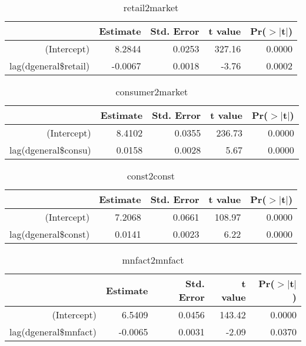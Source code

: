 \documentclass[12pt,a4paper]{report}
\begin{document}
	\begin{table}[ht]
		\centering
		\begin{tabular}{rrrrr}
			\hline
			& Estimate & Std. Error & t value & Pr($>$$|$t$|$) \\ 
			\hline
			(Intercept) & 8.2844 & 0.0253 & 327.16 & 0.0000 \\ 
			lag(dgeneral\$retail) & -0.0067 & 0.0018 & -3.76 & 0.0002 \\ 
			\hline
		\end{tabular}
		\caption{retail2market} 
	\end{table}
	
	\begin{table}[ht]
		\centering
		\begin{tabular}{rrrrr}
			\hline
			& Estimate & Std. Error & t value & Pr($>$$|$t$|$) \\ 
			\hline
			(Intercept) & 8.4102 & 0.0355 & 236.73 & 0.0000 \\ 
			lag(dgeneral\$consu) & 0.0158 & 0.0028 & 5.67 & 0.0000 \\ 
			\hline
		\end{tabular}
		\caption{consumer2market} 
	\end{table}
	
	\begin{table}[ht]
		\centering
		\begin{tabular}{rrrrr}
			\hline
			& Estimate & Std. Error & t value & Pr($>$$|$t$|$) \\ 
			\hline
			(Intercept) & 7.2068 & 0.0661 & 108.97 & 0.0000 \\ 
			lag(dgeneral\$const) & 0.0141 & 0.0023 & 6.22 & 0.0000 \\ 
			\hline
		\end{tabular}
		\caption{const2const} 
	\end{table}
	
	\begin{table}[ht]
		\centering
		\begin{tabular}{rrrrr}
			\hline
			& Estimate & Std. Error & t value & Pr($>$$|$t$|$) \\ 
			\hline
			(Intercept) & 6.5409 & 0.0456 & 143.42 & 0.0000 \\ 
			lag(dgeneral\$mnfact) & -0.0065 & 0.0031 & -2.09 & 0.0370 \\ 
			\hline
		\end{tabular}
		\caption{mnfact2mnfact} 
	\end{table}
	
\end{document}
